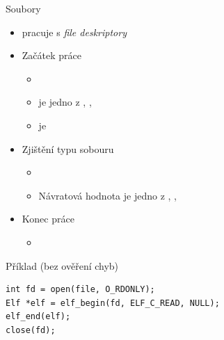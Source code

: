\begin{frame}[fragile]{}{Soubory}

  \begin{itemize}
    \item {} pracuje s \emph{file deskriptory}

    \pause

    \item Začátek práce
    \begin{itemize}
      \item {}
      \item {} je jedno z , ,
      \item {} je 
    \end{itemize}

    \pause

    \item Zjištění typu sobouru
    \begin{itemize}
      \item {}
      \item Návratová hodnota je jedno z , ,
              \emph{}
    \end{itemize}

    \pause

    \item Konec práce
    \begin{itemize}
      \item {}
    \end{itemize}
  \end{itemize}

  \pause

  \begin{block}{Příklad (bez ověření chyb)}
  \begin{lstlisting}[aboveskip=2pt,belowskip=2pt]
int fd = open(file, O_RDONLY);
Elf *elf = elf_begin(fd, ELF_C_READ, NULL);
elf_end(elf);
close(fd);
  \end{lstlisting}
  \end{block}

\end{frame}

